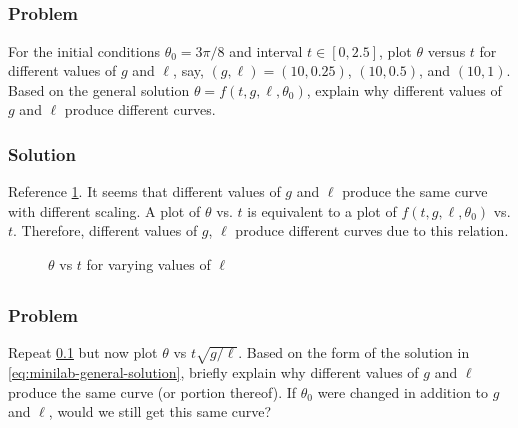 \documentclass[12pt]{article}
\begin{document}
\subsection{}
\label{sec:minilab-part-1}
  \subsubsection*{Problem}
  For the initial conditions $\theta_0=3\pi/8$ and interval $t\in[0,2.5]$, plot
  $\theta$ versus $t$ for different values of $g$ and $\ell$, say,
  $(g,\ell)=(10, 0.25)$, $(10, 0.5)$, and $(10, 1)$. Based on the general
  solution $\theta = f(t,g,\ell,\theta_0)$, explain why different values of $g$
  and $\ell$ produce different curves.

  \subsubsection*{Solution}
  Reference \cref{fig:minilab-part-1-solution}. It seems that different values of $g$ and
  $\ell$ produce the same curve with different scaling. A plot of $\theta$ vs.
  $t$ is equivalent to a plot of $f(t,g,\ell,\theta_0)$ vs. $t$. Therefore,
  different values of $g$, $\ell$ produce different curves due to this relation.
  \begin{figure}
    \centering
    \caption{$\theta$ vs $t$ for varying values of $\ell$}
\label{fig:minilab-part-1-solution}
  \end{figure}

\subsection{}
\label{sec:minilab-part-2}
  \subsubsection*{Problem}
  Repeat \cref{sec:minilab-part-1} but now plot $\theta$ vs $t\sqrt{g/\ell}$.
  Based on the form of the solution in \cref{eq:minilab-general-solution},
  briefly explain why different values of $g$ and $\ell$ produce the same curve
  (or portion thereof). If $\theta_0$ were changed in addition to $g$ and
  $\ell$, would we still get this same curve?
\end{document}
